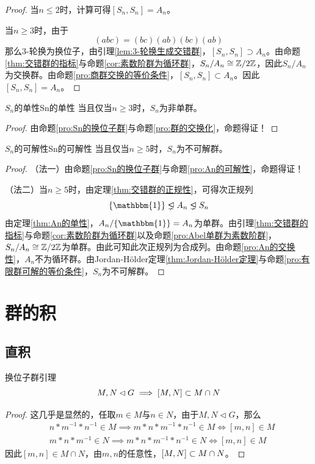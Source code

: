 \begin{proof}
	当$n\le 2$时，计算可得$[S_n,S_n]=A_n$。
	
	当$n\ge 3$时，由于
	$$
	(abc)=(bc)(ab)(bc)(ab)
	$$
	那么$3$-轮换为换位子，由引理\ref{lem:3-轮换生成交错群}，$[S_n,S_n]\supset A_n$。由命题\ref{thm:交错群的指标}与命题\ref{cor:素数阶群为循环群}，$S_n/A_n\cong\mathbb{Z}/2\mathbb{Z}$，因此$S_n/A_n$为交换群。由命题\ref{pro:商群交换的等价条件}，$[S_n,S_n]\subset A_n$。因此$[S_n,S_n]=A_n$。
\end{proof}

\begin{proposition}{$S_n$的单性}{Sn的单性}
	当且仅当$n\ge 3$时，$S_n$为非单群。
\end{proposition}

\begin{proof}
	由命题\ref{pro:Sn的换位子群}与命题\ref{pro:群的交换化}，命题得证！
\end{proof}

\begin{theorem}{$S_n$的可解性}{Sn的可解性}
	当且仅当$n\ge 5$时，$S_n$为不可解群。
\end{theorem}

\begin{proof}
	（法一）由命题\ref{pro:Sn的换位子群}与命题\ref{pro:An的可解性}，命题得证！
	
	（法二）当$n\ge 5$时，由定理\ref{thm:交错群的正规性}，可得次正规列
	$$
	\{\mathbbm{1}\}\lhdneq A_n \lhdneq S_n
	$$
	由定理\ref{thm:An的单性}，$A_n/\{\mathbbm{1}\}=A_n$为单群。由引理\ref{thm:交错群的指标}与命题\ref{cor:素数阶群为循环群}以及命题\ref{pro:Abel单群为素数阶群}，$S_n/A_n\cong \mathbb{Z}/2\mathbb{Z}$为单群。由此可知此次正规列为合成列。由命题\ref{pro:An的交换性}，$A_n$不为循环群。由Jordan-Hölder定理\ref{thm:Jordan-Hölder定理}与命题\ref{pro:有限群可解的等价条件}，$S_n$为不可解群。
\end{proof}

\section{群的积}

\subsection{直积}

\begin{lemma}{}{换位子群引理}
	$$
	M,N\lhd G\implies [M,N]\subset M\cap N
	$$
\end{lemma}

\begin{proof}
	这几乎是显然的，任取$m\in M$与$n\in N$，由于$M,N\lhd G$，那么
	\begin{align*}
		&n*m^{-1}*n^{-1}\in M\implies m*n*m^{-1}*n^{-1}\in M\iff [m,n]\in M\\
		&m*n*m^{-1}\in N\implies m*n*m^{-1}*n^{-1}\in N\iff [m,n]\in M
	\end{align*}
	因此$[m,n]\in M\cap N$，由$m,n$的任意性，$[M,N]\subset M\cap N$。
\end{proof}

